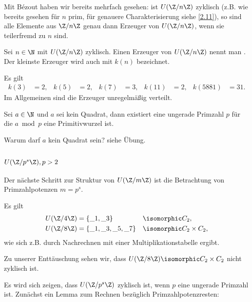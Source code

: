 Mit Bézout haben wir bereits mehrfach gesehen: ist $U(\Z / n \Z)$ zyklisch (z.B. wie bereits gesehen für $n$ prim, für genauere Charakterisierung siehe \ref{2.11}), so sind alle Elemente aus $\Z / n \Z$ genau dann Erzeuger von $U(\Z / n \Z)$, wenn sie teilerfremd zu $n$ sind.

\begin{df*}
	Sei $n \in \N$ mit $U(\Z / n \Z)$ zyklisch.
	Einen Erzeuger von $U(\Z / n \Z)$ nennt man .
	Der kleinste Erzeuger wird auch mit $k(n)$ bezeichnet.
\end{df*}

\begin{ex*}
	Es gilt
	\begin{align*}
		k(3) &= 2, &
		k(5) &= 2, &
		k(7) &= 3, &
		k(11) &= 2, &
		k(5881) &= 31.
	\end{align*}
	Im Allgemeinen sind die Erzeuger unregelmäßig verteilt.
\end{ex*}

\begin{conj*}[E. Artin]
	Sei $a \in \N$ und $a$ sei kein Quadrat, dann existiert eine ungerade Primzahl $p$ für die $a \bmod p$ eine Primitivwurzel ist.
	\begin{note}
		Warum darf $a$ kein Quadrat sein?
		siehe Übung.
	\end{note}
\end{conj*}

\subsection{\texorpdfstring{$U(\Z / p^s \Z), p > 2$}{U(ℤ/p\textasciicircum sℤ), p>2}}

Der nächste Schritt zur Struktur von $U(\Z / m \Z)$ ist die Betrachtung von Primzahlpotenzen $m = p^s$.

\begin{ex*}
	Es gilt
	\begin{alignat*}{3}
		U(\Z / 4 \Z) &= \{ \_ 1, \_ 3 \}& & \isomorphic C_2, \\
		U(\Z / 8 \Z) &= \{ \_ 1, \_ 3, \_ 5, \_ 7 \}& & \isomorphic C_2 \times C_2,
	\end{alignat*}
	wie sich z.B. durch Nachrechnen mit einer Multiplikationstabelle ergibt.

	Zu unserer Enttäuschung sehen wir, dass $U(\Z / 8 \Z) \isomorphic C_2 \times C_2$ nicht zyklisch ist.
\end{ex*}

Es wird sich zeigen, dass $U(\Z / p^s \Z)$ zyklisch ist, wenn $p$ eine ungerade Primzahl ist.
Zunächst ein Lemma zum Rechnen bezüglich Primzahlpotenzresten:

